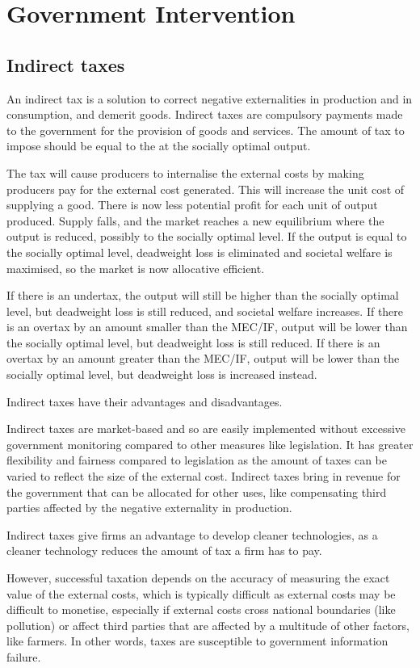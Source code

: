 \documentclass[Economics.tex]{subfiles}
\begin{document}
\chapter{Government Intervention}
\section{Indirect taxes}
An indirect tax is a solution to correct negative externalities in production and in consumption, and demerit goods. Indirect taxes are compulsory payments made to the government for the provision of goods and services. The amount of tax to impose should be equal to the  at the socially optimal output.

The tax will cause producers to internalise the external costs by making producers pay for the external cost generated. This will increase the unit cost of supplying a good. There is now less potential profit for each unit of output produced. Supply falls, and the market reaches a new equilibrium where the output is reduced, possibly to the socially optimal level. If the output is equal to the socially optimal level, deadweight loss is eliminated and societal welfare is maximised, so the market is now allocative efficient.

If there is an undertax, the output will still be higher than the socially optimal level, but deadweight loss is still reduced, and societal welfare increases. If there is an overtax by an amount smaller than the MEC/IF, output will be lower than the socially optimal level, but deadweight loss is still reduced. If there is an overtax by an amount greater than the MEC/IF, output will be lower than the socially optimal level, but deadweight loss is increased instead.

Indirect taxes have their advantages and disadvantages.

Indirect taxes are market-based and so are easily implemented without excessive government monitoring compared to other measures like legislation. It has greater flexibility and fairness compared to legislation as the amount of taxes can be varied to reflect the size of the external cost.
Indirect taxes bring in revenue for the government that can be allocated for other uses, like compensating third parties affected by the negative externality in production.

Indirect taxes give firms an advantage to develop cleaner technologies, as a cleaner technology reduces the amount of tax a firm has to pay.

However, successful taxation depends on the accuracy of measuring the exact value of the external costs, which is typically difficult as external costs may be difficult to monetise, especially if external costs cross national boundaries (like pollution) or affect third parties that are affected by a multitude of other factors, like farmers. In other words, taxes are susceptible to government information failure.
\end{document}

